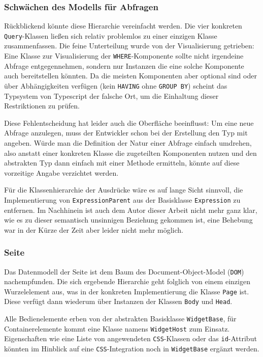 \subsubsection{Schwächen des Modells für Abfragen}

Rückblickend könnte diese Hierarchie vereinfacht werden. Die vier konkreten \texttt{Query}-Klassen ließen sich relativ problemlos zu einer einzigen Klasse zusammenfassen. Die feine Unterteilung wurde von der Visualisierung getrieben: Eine Klasse zur Visualisierung der \texttt{WHERE}-Komponente sollte nicht irgendeine Abfrage entgegennehmen, sondern nur Instanzen die eine solche Komponente auch bereitstellen könnten. Da die meisten Komponenten aber optional sind oder über Abhängigkeiten verfügen (kein \texttt{HAVING} ohne \texttt{GROUP BY}) scheint das Typsystem von Typescript der falsche Ort, um die Einhaltung dieser Restriktionen zu prüfen.

Diese Fehlentscheidung hat leider auch die Oberfläche beeinflusst: Um eine neue Abfrage anzulegen, muss der Entwickler schon bei der Erstellung den Typ mit angeben. Würde man die Definition der Natur einer Abfrage einfach umdrehen, also anstatt einer konkreten Klasse die zugeteilten Komponenten nutzen und den abstrakten Typ dann einfach mit einer Methode ermitteln, könnte auf diese vorzeitige Angabe verzichtet werden.

Für die Klassenhierarchie der Ausdrücke wäre es auf lange Sicht sinnvoll, die Implementierung von \texttt{ExpressionParent} aus der Basisklasse \texttt{Expression} zu entfernen. Im Nachhinein ist auch dem Autor dieser Arbeit nicht mehr ganz klar, wie es zu dieser semantisch unsinnigen Beziehung gekommen ist, eine Behebung war in der Kürze der Zeit aber leider nicht mehr möglich.

\subsubsection{Seite}

Das Datenmodell der Seite ist dem Baum des Document-Object-Model (\texttt{DOM}) nachempfunden. Die sich ergebende Hierarchie geht folglich von einem einzigen Wurzelelement aus, was in der konkreten Implementierung die Klasse \texttt{Page} ist. Diese verfügt dann wiederum über Instanzen der Klassen \texttt{Body} und \texttt{Head}.

Alle Bedienelemente erben von der abstrakten Basisklasse \texttt{WidgetBase}, für Containerelemente kommt eine Klasse namens \texttt{WidgetHost} zum Einsatz. Eigenschaften wie eine Liste von angewendeten \texttt{CSS}-Klassen oder das \texttt{id}-Attribut könnten im Hinblick auf eine \texttt{CSS}-Integration noch in \texttt{WidgetBase} ergänzt werden.


